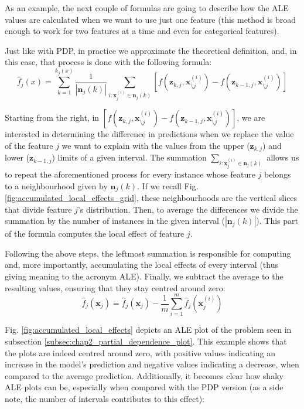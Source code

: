 As an example, the next couple of formulas are going to describe how the \ac{ALE} values are calculated when we want to use just one feature (this method is broad enough to work for two features at a time and even for categorical features).

Just like with \ac{PDP}, in practice we approximate the theoretical definition, and, in this case, that process is done with the following formula:
\begin{equation}
    \hat{f}_{j}(x) = \sum_{k=1}^{k_{j}(x)} \frac{1}{|\mathbf{n}_{j}(k)|} \sum_{i:\mathbf{x}_{j}^{(i)} \in \mathbf{n}_{j}(k)} [f(\mathbf{z}_{k,j},\mathbf{x}_{\setminus j}^{(i)}) - f(\mathbf{z}_{k-1,j},\mathbf{x}_{\setminus j}^{(i)})]
    \label{eq:8}
\end{equation}

Starting from the right, in $[f(\mathbf{z}_{k,j},\mathbf{x}_{\setminus j}^{(i)}) - f(\mathbf{z}_{k-1,j},\mathbf{x}_{\setminus j}^{(i)})]$, we are interested in determining the difference in predictions when we replace the value of the feature $j$ we want to explain with the values from the upper ($\mathbf{z}_{k,j}$) and lower ($\mathbf{z}_{k-1,j}$) limits of a given interval. The summation $\sum_{i:\mathbf{x}_{j}^{(i)} \in \mathbf{n}_{j}(k)}$ allows us to repeat the aforementioned process for every instance whose feature $j$ belongs to a neighbourhood given by $\mathbf{n}_{j}(k)$. If we recall Fig. \ref{fig:accumulated_local_effects_grid}, these neighbourhoods are the vertical slices that divide feature $j$'s distribution. Then, to average the differences we divide the summation by the number of instances in the given interval ($|\mathbf{n}_{j}(k)|$). This part of the formula computes the local effect of feature $j$.

Following the above steps, the leftmost summation is responsible for computing and, more importantly, accumulating the local effects of every interval (thus giving meaning to the acronym \ac{ALE}). Finally, we subtract the average to the resulting values, ensuring that they stay centred around zero:
\begin{equation}
    \hat{f}_{j}(\mathbf{x}_j) = \hat{f}_{j}(\mathbf{x}_j) - \frac{1}{m} \sum_{i=1}^{m} \hat{f}_{j}(\mathbf{x}_{j}^{(i)})
    \label{eq:9}
\end{equation}

Fig. \ref{fig:accumulated_local_effects} depicts an \ac{ALE} plot of the problem seen in subsection \ref{subsec:chap2_partial_dependence_plot}. This example shows that the plots are indeed centred around zero, with positive values indicating an increase in the model's prediction and negative values indicating a decrease, when compared to the average prediction. Additionally, it becomes clear how shaky \ac{ALE} plots can be, especially when compared with the \ac{PDP} version (as a side note, the number of intervals contributes to this effect):

